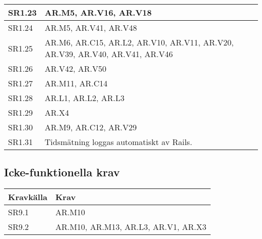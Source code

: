 \documentclass[a4paper, twoside, 11pt, titlepage]{article}
\begin{document}
\begin {table} [ht]
\begin{tabular} {  p{2cm} p{13cm} }
		\hline
		{SR1.23} & {AR.M5, AR.V16, AR.V18} \\
		\hline
		{SR1.24} & {AR.M5, AR.V41, AR.V48} \\
		\hline
		{SR1.25} & {AR.M6, AR.C15, AR.L2, AR.V10, AR.V11, AR.V20, AR.V39, AR.V40, AR.V41, AR.V46} \\
		\hline
		{SR1.26} & {AR.V42, AR.V50} \\
		\hline
		{SR1.27} & {AR.M11, AR.C14} \\
		\hline
		{SR1.28} & {AR.L1, AR.L2, AR.L3} \\
		\hline
		{SR1.29} & {AR.X4} \\
		\hline
		{SR1.30} & {AR.M9, AR.C12, AR.V29} \\
		\hline
		{SR1.31} & {Tidsmätning loggas automatiskt av Rails.} \\
		\hline
	\end{tabular} \end{table} \FloatBarrier


	\subsection{Icke-funktionella krav}


	\begin {table} [ht] \begin{tabular} {  p{2cm} p{13cm} }
		\hline
		{\sffamily\textbf{Kravkälla}} & {\sffamily\textbf{Krav}} \\
		\hline
		{SR9.1} & {AR.M10} \\
		\hline
		{SR9.2} & {AR.M10, AR.M13, AR.L3, AR.V1, AR.X3} \\
		\hline
	\end{tabular} \end{table} \FloatBarrier


\clearpage
	\appendix
\end{document}
